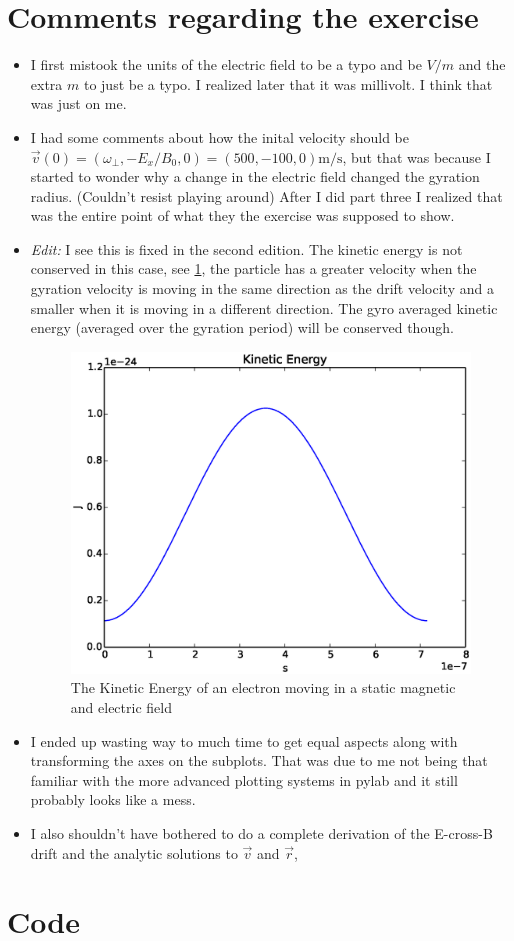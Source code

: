 \documentclass[x11names]{article}
\renewcommand{\va}{\vec}
\begin{document}
\appendix

\section{Comments regarding the exercise}
      \begin{itemize}
            \item I first mistook the units of the electric field to be a typo and be \(\si{V/m}\) and the extra \(m\) to just be a typo. I realized later that it was millivolt. I think that was just on me.
            \item I had some comments about how the inital velocity should be \(\va{v}(0) = (\omega_\perp, -E_x/B_0, 0 ) =(500,-100,0) \si{\meter\per\second}\), but that was because I started to wonder why a change in the electric field changed the gyration radius. (Couldn't resist playing around) After I did part three I realized that was the entire point of what they the exercise was supposed to show. 
            \item \textit{Edit:} I see this is fixed in the second edition. \newline
            The kinetic energy is not conserved in this case, see \cref{fig:kineticEnergy}, the particle has a greater velocity when the gyration velocity is moving in the same direction as the drift velocity and a smaller when it is moving in a different direction. The gyro averaged kinetic energy (averaged over the gyration period) will be conserved though.
                  \begin{figure}
                  \centering
                        \includegraphics[width = 0.5\linewidth] {../source/kineticEnergy}
                        \caption{The Kinetic Energy of an electron moving in a static magnetic and electric field}
                        \label{fig:kineticEnergy}
                  \end{figure}
            \item I ended up wasting way to much time to get equal aspects along with transforming the axes on the subplots. That was due to me not being that familiar with the more advanced plotting systems in pylab and it still probably looks like a mess.
            \item I also shouldn't have bothered to do a complete derivation of the E-cross-B drift and the analytic solutions to \(\va{v}\) and \( \va{r} \), 
      \end{itemize}

\newpage
\section{Code}
      \label{sec:code}
      

      
\end{document}
